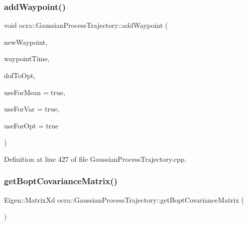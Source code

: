 \hypertarget{classocra_1_1GaussianProcessTrajectory_ae6f9369c9494f40790e08c572c3e2bba}{}\label{classocra_1_1GaussianProcessTrajectory_ae6f9369c9494f40790e08c572c3e2bba} 
\subsubsection{\texorpdfstring{add\+Waypoint()}{addWaypoint()}\hspace{0.1cm}{\footnotesize\ttfamily [2/2]}}
{\footnotesize\ttfamily void ocra\+::\+Gaussian\+Process\+Trajectory\+::add\+Waypoint (\begin{DoxyParamCaption}\item[{const Eigen\+::\+Vector\+Xd}]{new\+Waypoint,  }\item[{const double}]{waypoint\+Time,  }\item[{const Eigen\+::\+Vector\+Xi \&}]{dof\+To\+Opt,  }\item[{const bool}]{use\+For\+Mean = {\ttfamily true},  }\item[{const bool}]{use\+For\+Var = {\ttfamily true},  }\item[{const bool}]{use\+For\+Opt = {\ttfamily true} }\end{DoxyParamCaption})}



Definition at line 427 of file Gaussian\+Process\+Trajectory.\+cpp.

\hypertarget{classocra_1_1GaussianProcessTrajectory_ae5e2bdca5a250cbce6af8e38898a61c8}{}\label{classocra_1_1GaussianProcessTrajectory_ae5e2bdca5a250cbce6af8e38898a61c8} 
\subsubsection{\texorpdfstring{get\+Bopt\+Covariance\+Matrix()}{getBoptCovarianceMatrix()}}
{\footnotesize\ttfamily Eigen\+::\+Matrix\+Xd ocra\+::\+Gaussian\+Process\+Trajectory\+::get\+Bopt\+Covariance\+Matrix (\begin{DoxyParamCaption}{ }\end{DoxyParamCaption})}



